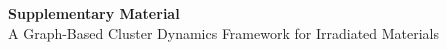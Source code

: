 \documentclass[11pt]{article}
\begin{document}
\begin{center}
{\Large\bfseries Supplementary Material}\\[4pt]
{\large A Graph-Based Cluster Dynamics Framework for Irradiated Materials}
\end{center}



\clearpage


\end{document}
